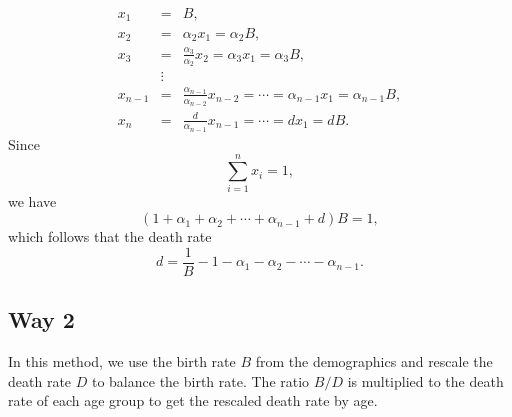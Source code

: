 \documentclass{article}
\begin{document}
\begin{eqnarray*} 
x_1 & = & B,  \\
x_2 & = & \alpha_2x_1 = \alpha_2B, \\
x_3 & = & \frac{\alpha_3}{\alpha_2}x_2 = \alpha_3 x_1 = \alpha_3B,\\
&\vdots&\\
x_{n-1} & = & \frac{\alpha_{n-1}}{\alpha_{n-2}}x_{n-2} = \cdots = \alpha_{n-1} x_1 = \alpha_{n-1}B,\\
x_n & = & \frac{d}{\alpha_{n-1}}x_{n-1} = \cdots = dx_1 = dB.
\end{eqnarray*}
Since 
\[
\sum_{i = 1}^n x_i = 1,
\]
we have
\[
(1+\alpha_1 + \alpha_2 + \cdots + \alpha_{n-1} + d)B = 1,
\]
which follows that the death rate 
\[
d = \frac{1}{B}-1-\alpha_1 - \alpha_2 - \cdots - \alpha_{n-1}.
\]


\subsection{Way 2}
In this method, we use the birth rate $B$ from the demographics and rescale the death rate $D$ to balance the birth rate. The ratio $B/D$ is multiplied to the death rate of each age group to get the rescaled death rate by age. 
\end{document}
